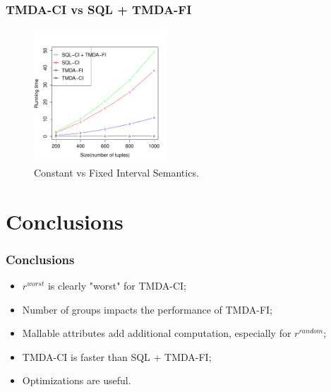 \documentclass[]{beamer}
\begin{document}
\begin{frame}
\frametitle{TMDA-CI vs SQL + TMDA-FI}
\begin{figure}[ht!]
\centering 
\includegraphics[width=50mm]{../graphs/sql_tmda_fi.pdf}
\caption{Constant vs Fixed Interval Semantics.}
\label{sql_tmda_fi} 
\end{figure}
\end{frame}

\section{Conclusions}
\begin{frame}
\frametitle{Conclusions}
\begin{itemize}
\item 
$r^{worst}$ is clearly "worst" for TMDA-CI;
\item
Number of groups impacts the performance of TMDA-FI;
\item
Mallable attributes add additional computation, especially for $r^{random}$;
\item
TMDA-CI is faster than SQL + TMDA-FI;
\item
Optimizations are useful.
\end{itemize}
\end{frame}
\end{document}
